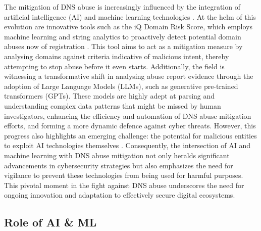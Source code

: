 The mitigation of DNS abuse is increasingly influenced by the integration of artificial intelligence (AI) and machine learning technologies \cite{goethals2021enabling}. At the helm of this evolution are innovative tools such as the iQ Domain Risk Score, which employs machine learning and string analytics to proactively detect potential domain abuses now of registration \cite{dnsabuseAI2023}. This tool aims to act as a mitigation measure by analysing domains against criteria indicative of malicious intent, thereby attempting to stop abuse before it even starts. Additionally, the field is witnessing a transformative shift in analysing abuse report evidence through the adoption of Large Language Models (LLMs), such as generative pre-trained transformers (GPTs). These models are highly adept at parsing and understanding complex data patterns that might be missed by human investigators, enhancing the efficiency and automation of DNS abuse mitigation efforts, and forming a more dynamic defence against cyber threats. However, this progress also highlights an emerging challenge: the potential for malicious entities to exploit AI technologies themselves \cite{halvorsenAI2023}.  Consequently, the intersection of AI and machine learning with DNS abuse mitigation not only heralds significant advancements in cybersecurity strategies but also emphasizes the need for vigilance to prevent these technologies from being used for harmful purposes. This pivotal moment in the fight against DNS abuse underscores the need for ongoing innovation and adaptation to effectively secure digital ecosystems.

\subsection{Role of AI \& ML}

